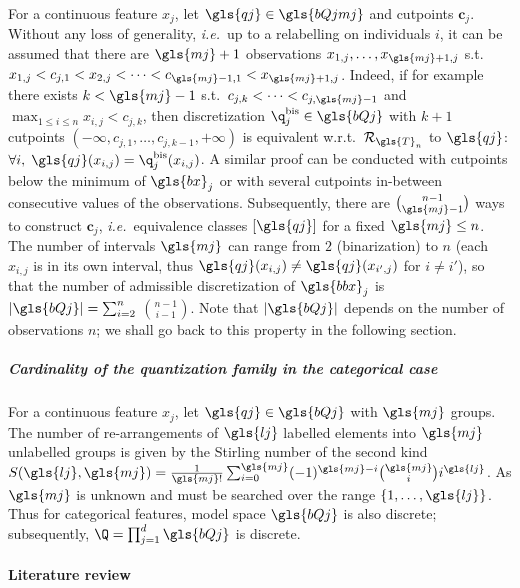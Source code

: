 For a continuous feature $x_j$, let $\gls{qj} \in \gls{bQjmj}$ and cutpoints $\boldsymbol{c}_j$. Without any loss of generality, \textit{i.e.}\ up to a relabelling on individuals $i$, it can be assumed that there are $\gls{mj}+1$ observations $x_{1,j},\dots,x_{\gls{mj}+1,j}$ s.t.\ $x_{1,j} < c_{j,1} < x_{2,j} < \dots < c_{\gls{mj}-1,1} < x_{\gls{mj}+1,j}$. Indeed, if for example there exists $k < \gls{mj} - 1$ s.t.\ $c_{j,k} < \dots < c_{j,\gls{mj}-1}$ and $\max_{1 \leq i \leq n} x_{i,j} < c_{j,k}$, then discretization $\q^{\text{bis}}_j \in \gls{bQj}$ with $k+1$ cutpoints $(-\infty,c_{j,1},\dots,c_{j,k-1},+\infty)$ is equivalent w.r.t.\ $\mathcal{R}_{\gls{T}_n}$ to $\gls{qj}$: $\forall i, \; \gls{qj}(x_{i,j}) = \q^{\text{bis}}_j(x_{i,j})$. A similar proof can be conducted with cutpoints below the minimum of $\gls{bx}_j$ or with several cutpoints in-between consecutive values of the observations. Subsequently, there are $\binom{n-1}{\gls{mj}-1}$ ways to construct $\bm{c}_j$, \textit{i.e.}\ equivalence classes $[\gls{qj}]$ for a fixed $\gls{mj} \leq n$. The number of intervals $\gls{mj}$ can range from $2$ (binarization) to $n$ (each $x_{i,j}$ is in its own interval, thus $\gls{qj}(x_{i,j}) \neq \gls{qj}(x_{i',j})$ for $i \neq i'$), so that the number of admissible discretization of $\gls{bbx}_j$ is $|\gls{bQj}| = \sum_{i=2}^{n}$ ${n-1}\choose{i-1}$. Note that $|\gls{bQj}|$ depends on the number of observations $n$; we shall go back to this property in the following section.


\subparagraph{Cardinality of the quantization family in the categorical case}

For a continuous feature $x_j$, let $\gls{qj} \in \gls{bQj}$ with $\gls{mj}$ groups. The number of re-arrangements of $\gls{lj}$ labelled elements into $\gls{mj}$ unlabelled groups is given by the Stirling number of the second kind $S(\gls{lj},\gls{mj}) = \frac{1}{\gls{mj}!} \sum_{i=0}^{\gls{mj}} (-1)^{\gls{mj}-i} {\gls{mj} \choose i} i^{\gls{lj}}$. As $\gls{mj}$ is unknown and must be searched over the range $\{1,\dots,\gls{lj}\}$. Thus for categorical features, model space $\gls{bQj}$ is also discrete; subsequently, $\Q = \prod_{j=1}^d \gls{bQj}$ is discrete.







\paragraph{Literature review}

